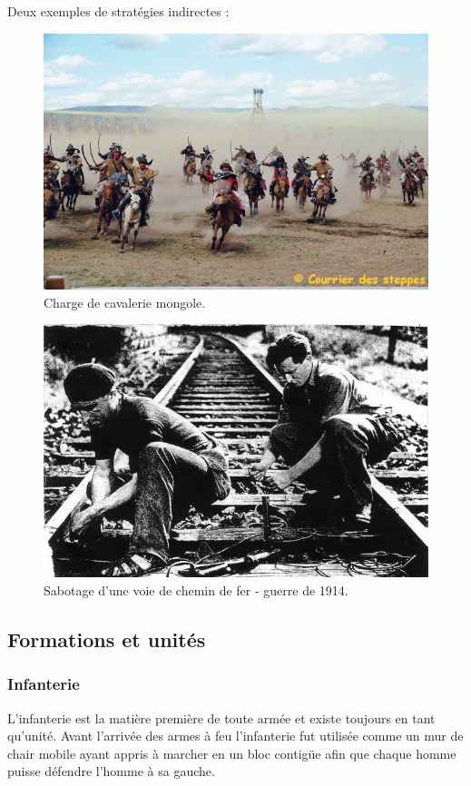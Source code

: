 \documentclass{article}
\begin{document}
Deux exemples de stratégies indirectes :
\begin{figure}[H]
	\begin{centering}
	\includegraphics[width=0.8\linewidth]{../ressources/mongol_army}
	\caption{Charge de cavalerie mongole. \cite{mongol_cavalery}}
	\end{centering}
\end{figure}
\begin{figure}[H]
	\begin{centering}
	\includegraphics[width=0.8\linewidth]{../ressources/sabotage_maquisards}
	\caption{Sabotage d'une voie de chemin de fer - guerre de 1914. \cite{sabotage}}
	\end{centering}
\end{figure}
\cite{war}


\subsection{Formations et unités}

\subsubsection{Infanterie}
L'infanterie est la matière première de toute armée et existe toujours en tant qu'unité. Avant l'arrivée des armes à feu l'infanterie fut utilisée comme un mur de chair mobile ayant appris à marcher en un bloc contigüe afin que chaque homme puisse défendre l'homme à sa gauche.
\end{document}
